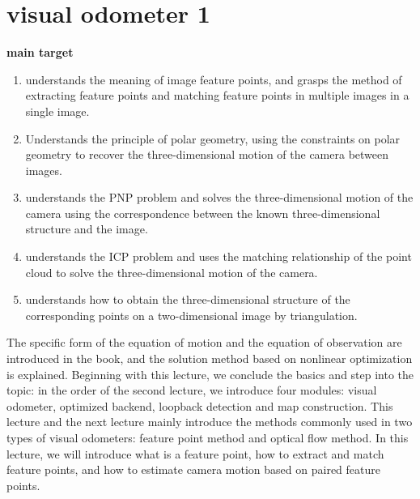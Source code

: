 \chapter{visual odometer 1}
\label{cpt:7}
\thispagestyle{empty}

\begin{mdframed}
\textbf{main target}
\begin{enumerate}[labelindent=0em,leftmargin=1.5em]
\item understands the meaning of image feature points, and grasps the method of extracting feature points and matching feature points in multiple images in a single image.
\item Understands the principle of polar geometry, using the constraints on polar geometry to recover the three-dimensional motion of the camera between images.
\item understands the PNP problem and solves the three-dimensional motion of the camera using the correspondence between the known three-dimensional structure and the image.
\item understands the ICP problem and uses the matching relationship of the point cloud to solve the three-dimensional motion of the camera.
\item understands how to obtain the three-dimensional structure of the corresponding points on a two-dimensional image by triangulation.
\end{enumerate}
\end{mdframed}

The specific form of the equation of motion and the equation of observation are introduced in the book, and the solution method based on nonlinear optimization is explained. Beginning with this lecture, we conclude the basics and step into the topic: in the order of the second lecture, we introduce four modules: visual odometer, optimized backend, loopback detection and map construction. This lecture and the next lecture mainly introduce the methods commonly used in two types of visual odometers: feature point method and optical flow method. In this lecture, we will introduce what is a feature point, how to extract and match feature points, and how to estimate camera motion based on paired feature points.

\newpage


\newpage

